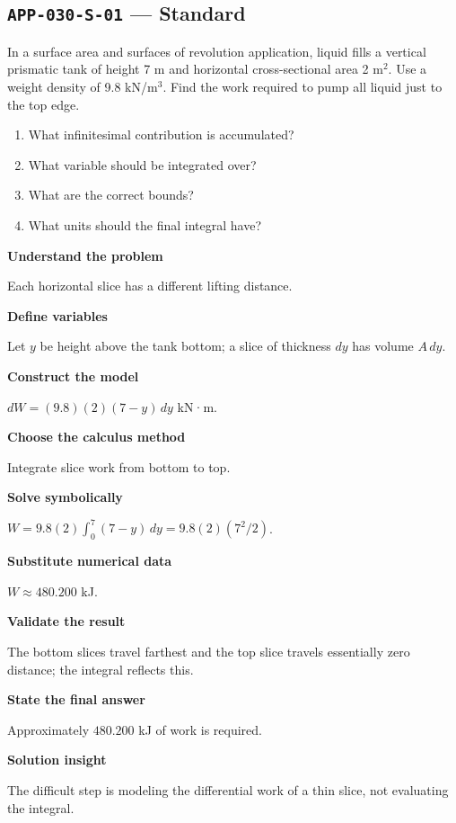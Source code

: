 \documentclass[11pt]{book}
\newcommand{\pid}[1]{\texttt{#1}}
\begin{document}
\subsection*{\pid{APP-030-S-01} — Standard}
\begin{problembox}
In a surface area and surfaces of revolution application, liquid fills a vertical prismatic tank of height 7 m and horizontal cross-sectional area 2 m$^2$. Use a weight density of 9.8 kN/m$^3$. Find the work required to pump all liquid just to the top edge.
\end{problembox}
\begin{promptbox}\begin{enumerate}
\item What infinitesimal contribution is accumulated?
\item What variable should be integrated over?
\item What are the correct bounds?
\item What units should the final integral have?
\end{enumerate}\end{promptbox}
\begin{solutionbox}
\textbf{Understand the problem}\par Each horizontal slice has a different lifting distance.\par\medskip
\textbf{Define variables}\par Let $y$ be height above the tank bottom; a slice of thickness $dy$ has volume $A\,dy$.\par\medskip
\textbf{Construct the model}\par $dW=(9.8)(2)(7-y)\,dy$ kN·m.\par\medskip
\textbf{Choose the calculus method}\par Integrate slice work from bottom to top.\par\medskip
\textbf{Solve symbolically}\par $W=9.8(2)\int_0^{7}(7-y)\,dy=9.8(2)(7^2/2)$.\par\medskip
\textbf{Substitute numerical data}\par $W\approx 480.200$ kJ.\par\medskip
\textbf{Validate the result}\par The bottom slices travel farthest and the top slice travels essentially zero distance; the integral reflects this.\par\medskip
\textbf{State the final answer}\par Approximately $480.200$ kJ of work is required.\par\medskip
\textbf{Solution insight}\par The difficult step is modeling the differential work of a thin slice, not evaluating the integral.\par\medskip
\end{solutionbox}
\end{document}
